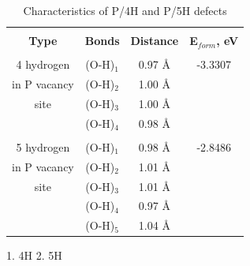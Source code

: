 


\begin{table}[h]
\caption{Characteristics of P/4H and P/5H defects}
\label{tabular:4or5H}
\begin{center}
\begin{tabular}{|c|c|c|c|}
\hline
& & & \\
\textbf{Type} & \textbf{Bonds} & \textbf{Distance} & \textbf{E$_{form}$, eV} \\
\hline
& & & \\
4 hydrogen & (O-H)$_{1}$ &  0.97 \AA &  -3.3307 \\ 
in P vacancy & (O-H)$_{2}$ & 1.00 \AA & \\
site  & (O-H)$_{3}$ & 1.00 \AA & \\
& (O-H)$_{4}$ & 0.98 \AA &\\
\hline
& & & \\
5 hydrogen & (O-H)$_{1}$ &  0.98 \AA &  -2.8486 \\ 
in P vacancy & (O-H)$_{2}$ & 1.01 \AA & \\
site  & (O-H)$_{3}$ & 1.01 \AA & \\
& (O-H)$_{4}$ & 0.97 \AA & \\
& (O-H)$_{5}$ & 1.04 \AA & \\
\hline
\end{tabular}
\end{center}
\end{table}

1. 4H
2. 5H 